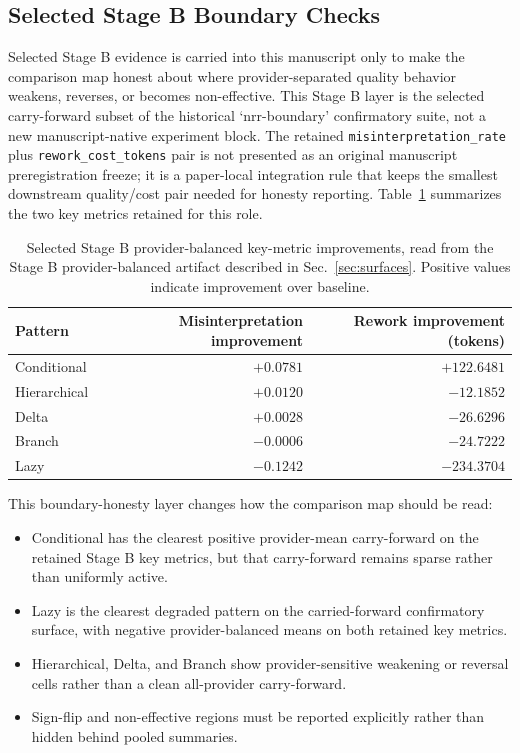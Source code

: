 \documentclass[11pt,a4paper]{article}
\begin{document}
\subsection{Selected Stage B Boundary Checks}

Selected Stage B evidence is carried into this manuscript only to make the comparison map honest about where provider-separated quality behavior weakens, reverses, or becomes non-effective. This Stage B layer is the selected carry-forward subset of the historical `nrr-boundary' confirmatory suite, not a new manuscript-native experiment block. The retained \texttt{misinterpretation\_rate} plus \texttt{rework\_cost\_tokens} pair is not presented as an original manuscript preregistration freeze; it is a paper-local integration rule that keeps the smallest downstream quality/cost pair needed for honesty reporting. Table~\ref{tab:stageb_selected_nrr_patterns} summarizes the two key metrics retained for this role.

\begin{table}[t]
\centering
\small
\begin{tabular}{lrr}
\toprule
\textbf{Pattern} & \textbf{Misinterpretation improvement} & \textbf{Rework improvement (tokens)} \\
\midrule
Conditional & \(+0.0781\) & \(+122.6481\) \\
Hierarchical & \(+0.0120\) & \(-12.1852\) \\
Delta & \(+0.0028\) & \(-26.6296\) \\
Branch & \(-0.0006\) & \(-24.7222\) \\
Lazy & \(-0.1242\) & \(-234.3704\) \\
\bottomrule
\end{tabular}
\caption{Selected Stage B provider-balanced key-metric improvements, read from the Stage B provider-balanced artifact described in Sec.~\ref{sec:surfaces}. Positive values indicate improvement over baseline.}
\label{tab:stageb_selected_nrr_patterns}
\end{table}

This boundary-honesty layer changes how the comparison map should be read:
\begin{itemize}
  \item Conditional has the clearest positive provider-mean carry-forward on the retained Stage B key metrics, but that carry-forward remains sparse rather than uniformly active.
  \item Lazy is the clearest degraded pattern on the carried-forward confirmatory surface, with negative provider-balanced means on both retained key metrics.
  \item Hierarchical, Delta, and Branch show provider-sensitive weakening or reversal cells rather than a clean all-provider carry-forward.
  \item Sign-flip and non-effective regions must be reported explicitly rather than hidden behind pooled summaries.
\end{itemize}
\end{document}
